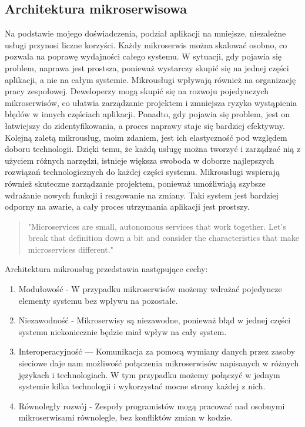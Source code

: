 \documentclass[runningheads,12pt]{llncs}
\begin{document}
\subsection{Architektura mikroserwisowa}

Na podstawie mojego doświadczenia, podział aplikacji na mniejsze, niezależne usługi przynosi liczne korzyści. Każdy mikroserwis można skalować osobno, co pozwala na poprawę wydajności całego systemu. W sytuacji, gdy pojawia się problem, naprawa jest prostsza, ponieważ wystarczy skupić się na jednej części aplikacji, a nie na całym systemie. Mikrousługi wpływają również na organizację pracy zespołowej. Deweloperzy mogą skupić się na rozwoju pojedynczych mikroserwisów, co ułatwia zarządzanie projektem i zmniejsza ryzyko wystąpienia błędów w innych częściach aplikacji. Ponadto, gdy pojawia się problem, jest on łatwiejszy do zidentyfikowania, a proces naprawy staje się bardziej efektywny. Kolejną zaletą mikrousług, moim zdaniem, jest ich elastyczność pod względem doboru technologii. Dzięki temu, że każdą usługę można tworzyć i zarządzać nią z użyciem różnych narzędzi, istnieje większa swoboda w doborze najlepszych rozwiązań technologicznych do każdej części systemu. Mikrousługi wspierają również skuteczne zarządzanie projektem, ponieważ umożliwiają szybsze wdrażanie nowych funkcji i reagowanie na zmiany. Taki system jest bardziej odporny na awarie, a cały proces utrzymania aplikacji jest prostszy.
\begin{quote}
    "Microservices are small, autonomous services that work together. Let’s break that definition down a bit and consider the characteristics that make microservices different."~\cite[p. 2]{newman2015building}
\end{quote}

Architektura mikrousług przedstawia następujące cechy:

\begin{enumerate}
    \item Modułowość - W przypadku mikroserwisów możemy wdrażać pojedyncze elementy systemu bez wpływu na pozostałe.
    \item Niezawodność - Mikroserwisy są niezawodne, ponieważ błąd w jednej części systemu niekoniecznie będzie miał wpływ na cały system.
    \item Interoperacyjność — Komunikacja za pomocą wymiany danych przez zasoby sieciowe daje nam możliwość połączenia mikroserwisów napisanych w różnych językach i technologiach. W tym przypadku możemy połączyć w jednym systemie kilka technologii i wykorzystać mocne strony każdej z nich.
    \item Równoległy rozwój - Zespoły programistów mogą pracować nad osobnymi mikroserwisami równolegle, bez konfliktów zmian w kodzie.
\end{enumerate}
\end{document}
